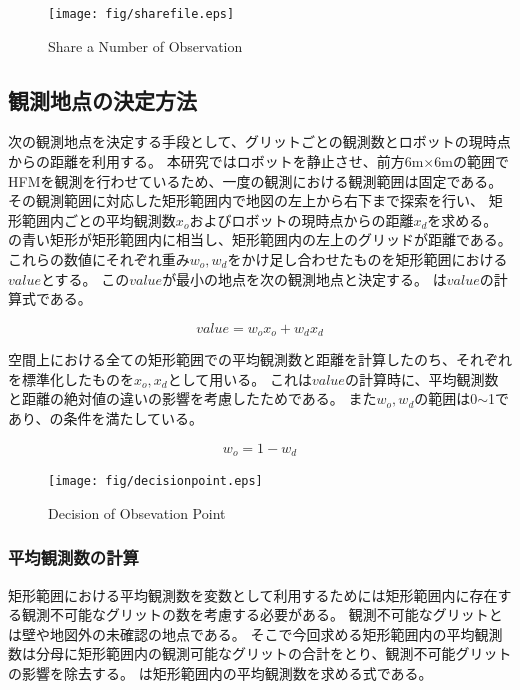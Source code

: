 \documentclass{jsarticle}
\begin{document}
\begin{figure}[tbh]
 \centering
  \texttt{[image: fig/sharefile.eps]}
  \vspace*{-4mm}
  \caption{Share a Number of Observation}
  \label{fig: sharefile}
\end{figure}


\subsection{観測地点の決定方法}
\label{decide}
次の観測地点を決定する手段として、グリットごとの観測数とロボットの現時点からの距離を利用する。
本研究ではロボットを静止させ、前方6m$\times$6mの範囲でHFMを観測を行わせているため、一度の観測における観測範囲は固定である。
その観測範囲に対応した矩形範囲内で地図の左上から右下まで探索を行い、
矩形範囲内ごとの平均観測数$x_{o}$およびロボットの現時点からの距離$x_{d}$を求める。
の青い矩形が矩形範囲内に相当し、矩形範囲内の左上のグリッドが距離である。
これらの数値にそれぞれ重み$w_{o},w_{d}$をかけ足し合わせたものを矩形範囲における$value$とする。
この$value$が最小の地点を次の観測地点と決定する。
は$value$の計算式である。

\begin{equation}
  value = w_{o}x_{o} + w_{d}x_{d}
	\label{eqn: value}
\end{equation}

空間上における全ての矩形範囲での平均観測数と距離を計算したのち、それぞれを標準化したものを$x_o,x_d$として用いる。
これは$value$の計算時に、平均観測数と距離の絶対値の違いの影響を考慮したためである。
また$w_o,w_d$の範囲は0$\sim$1であり、の条件を満たしている。

\begin{equation}
  w_o = 1 - w_d
	\label{eqn: weight}
\end{equation}


\begin{figure}[tbh]
 \centering
  \texttt{[image: fig/decisionpoint.eps]}
  \vspace*{-4mm}
  \caption{Decision of Obsevation Point}
  \label{fig: value-method}
\end{figure}

\subsubsection{平均観測数の計算}
矩形範囲における平均観測数を変数として利用するためには矩形範囲内に存在する観測不可能なグリットの数を考慮する必要がある。
観測不可能なグリットとは壁や地図外の未確認の地点である。
そこで今回求める矩形範囲内の平均観測数は分母に矩形範囲内の観測可能なグリットの合計をとり、観測不可能グリットの影響を除去する。
は矩形範囲内の平均観測数を求める式である。
\end{document}
